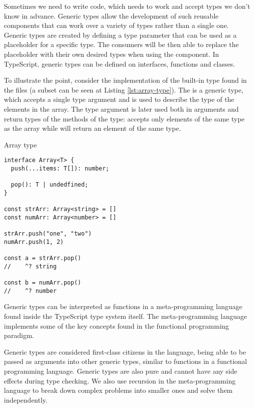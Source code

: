 Sometimes we need to write code, which needs to work and accept types we don't know in advance. Generic types allow the development of such reusable components that can work over a variety of types rather than a single one. Generic types are created by defining a type parameter that can be used as a placeholder for a specific type. The consumers will be then able to replace the placeholder with their own desired types when using the component. In TypeScript, generic types can be defined on interfaces, functions and classes.

To illustrate the point, consider the implementation of the built-in  type found in the  files (a subset can be seen at Listing \ref{lst:array-type}). The  is a generic type, which accepts a single type argument  and is used to describe the type of the elements in the array. The type argument  is later used both in arguments and return types of the methods of the  type:  accepts only elements of the same type as the array while  will return an element of the same type.

\begin{listing}[ht]
  \caption{Array type}\label{lst:array-type}
  \begin{verbatim}
interface Array<T> {
  push(...items: T[]): number;

  pop(): T | undedfined;
}

const strArr: Array<string> = []
const numArr: Array<number> = []

strArr.push("one", "two")
numArr.push(1, 2)

const a = strArr.pop()
//    ^? string

const b = numArr.pop()
//    ^? number
\end{verbatim}
\end{listing}

Generic types can be interpreted as functions in a meta-programming language found inside the TypeScript type system itself. The meta-programming language implements some of the key concepts found in the functional programming paradigm.

Generic types are considered first-class citizens in the language, being able to be passed as arguments into other generic types, similar to functions in a functional programming language. Generic types are also pure and cannot have any side effects during type checking. We also use recursion in the meta-programming language to break down complex problems into smaller ones and solve them independently.

